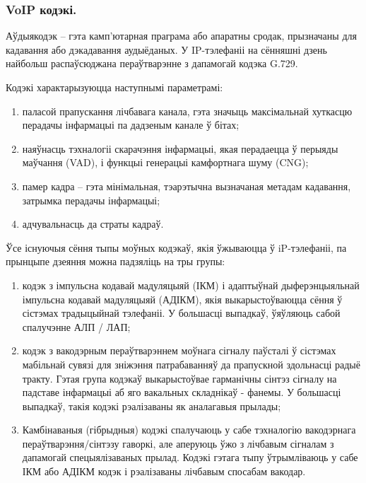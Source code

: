 \vspace{-\baselineskip}
\subsubsection{VoIP кодэкі.}

Аўдыякодэк -- гэта камп'ютарная праграма або апаратны сродак, прызначаны для кадавання або дэкадавання аудыёданых. У IP-тэлефаніі на сённяшні дзень найбольш распаўсюджана пераўтварэнне з дапамогай кодэка G.729.

Кодэкі характарызуюцца наступнымі параметрамі:
\begin{enumerate}
    \item паласой прапускання лічбавага канала, гэта значыць максімальнай хуткасцю перадачы інфармацыі па дадзеным канале ў бітах;
    \item наяўнасць тэхналогіі скарачэння інфармацыі, якая перадаецца ў перыяды маўчання (VAD), і функцыі генерацыі камфортнага шуму (CNG);
    \item памер кадра -- гэта мінімальная, тэарэтычна вызначаная метадам кадавання, затрымка перадачы інфармацыі;
    \item адчувальнасць да страты кадраў.
\end{enumerate}

Ўсе існуючыя сёння тыпы моўных кодэкаў, якія ўжываюцца ў iP-тэлефаніі, па прынцыпе дзеяння можна падзяліць на тры групы:
\begin{enumerate}
    \item кодэк з імпульсна кодавай мадуляцыяй (ІКМ) і адаптыўнай дыферэнцыяльнай імпульсна кодавай мадуляцыяй (АДІКМ), якія выкарыстоўваюцца сёння ў сістэмах традыцыйнай тэлефаніі. У большасці выпадкаў, ўяўляюць сабой спалучэнне АЛП / ЛАП;
    \item кодэк з вакодэрным пераўтварэннем моўнага сігналу паўсталі ў сістэмах мабільнай сувязі для зніжэння патрабаванняў да прапускной здольнасці радыё тракту. Гэтая група кодэкаў выкарыстоўвае гарманічны сінтэз сігналу на падставе інфармацыі аб яго вакальных складнікаў - фанемы. У большасці выпадкаў, такія кодэкі рэалізаваны як аналагавыя прылады;
    \item Камбінаваныя (гібрыдныя) кодэкі спалучаюць у сабе тэхналогію вакодэрнага пераўтварэння/сінтэзу гаворкі, але аперуюць ўжо з лічбавым сігналам з дапамогай спецыялізаваных прылад. Кодэкі гэтага тыпу ўтрымліваюць у сабе ІКМ або АДІКМ кодэк і рэалізаваны лічбавым спосабам вакодар.
\end{enumerate}

